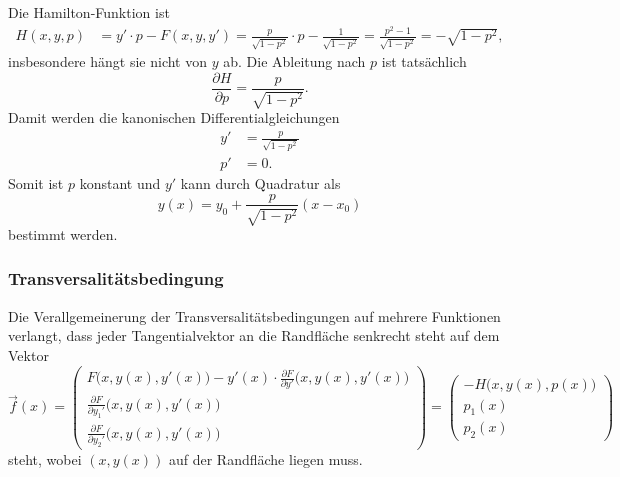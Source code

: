 \begin{beispiel}
Die Hamilton-Funktion ist
\begin{align*}
H(x,y,p)
&=
y'\cdot p - F(x,y,y')
=
\frac{p}{\sqrt{1-p^2}}\cdot p - \frac{1}{\sqrt{1-p^2}}
=
\frac{p^2-1}{\sqrt{1-p^2}}
=
-\sqrt{1-p^2},
\end{align*}
insbesondere hängt sie nicht von $y$ ab.
Die Ableitung nach $p$ ist tatsächlich
\begin{equation}
\frac{\partial H}{\partial p}
=
\frac{p}{\sqrt{1-p^2}}.
\label{buch:hamiltonjacobi:kanonisch:bsp:dHdp}
\end{equation}
Damit werden die kanonischen Differentialgleichungen
\begin{align*}
y' &= \frac{p}{\sqrt{1-p^2}} \\
p' &= 0.
\end{align*}
Somit ist $p$ konstant und $y'$ kann durch Quadratur als
\[
y(x)
=
y_0 + \frac{p}{\sqrt{1-p^2}}(x-x_0)
\]
bestimmt werden.
\end{beispiel}

%
%
\subsubsection{Transversalitätsbedingung}
Die Verallgemeinerung der Transversalitätsbedingungen auf mehrere
Funktionen verlangt, dass jeder Tangentialvektor an die Randfläche
senkrecht steht auf dem Vektor
\[
\vec{f}(x)
=
\begin{pmatrix}
\displaystyle
F\bigl(x,y(x),y'(x)\bigr)
-
y'(x)\cdot \frac{\partial F}{\partial y'}\bigl(x,y(x),y'(x)\bigr)
\\
\displaystyle
\frac{\partial F}{\partial y_1'}\bigl(x,y(x),y'(x)\bigr)
\\[9pt]
\displaystyle
\frac{\partial F}{\partial y_2'}\bigl(x,y(x),y'(x)\bigr)
\end{pmatrix}
=
\begin{pmatrix}
-H\bigl(x,y(x),p(x)\bigr)\\
p_1(x)\\
p_2(x)
\end{pmatrix}
\]
steht, wobei $(x,y(x))$ auf der Randfläche liegen muss.

